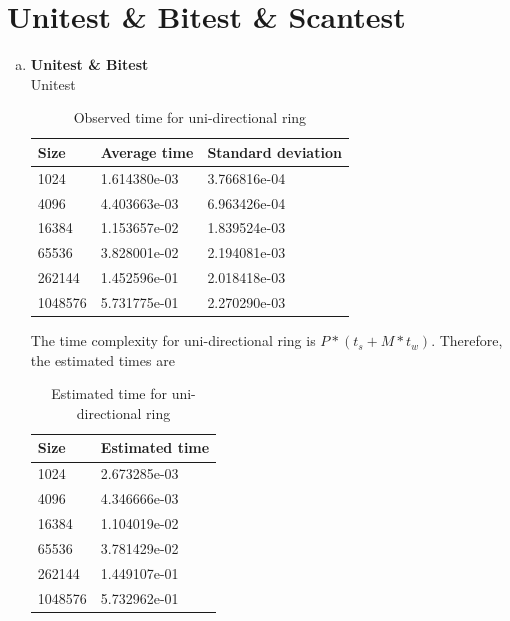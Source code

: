 \documentclass[10pt,letterpaper]{article}
\begin{document}
\section{Unitest \& Bitest \& Scantest}
\begin{enumerate}[(a)]
\item \textbf{Unitest \& Bitest}\\[10pt]
Unitest\\[10pt]
\begin{table}[h]
\centering
\begin{tabular}{lll}\hline
Size    & Average time & Standard deviation \\\hline
1024    & 1.614380e-03 & 3.766816e-04       \\
4096    & 4.403663e-03 & 6.963426e-04       \\
16384   & 1.153657e-02 & 1.839524e-03       \\
65536   & 3.828001e-02 & 2.194081e-03       \\
262144  & 1.452596e-01 & 2.018418e-03       \\
1048576 & 5.731775e-01 & 2.270290e-03      \\\hline
\end{tabular}
\caption{Observed time for uni-directional ring}
\end{table}


The time complexity for uni-directional ring is $P*(t_s+M*t_w)$. Therefore, the estimated times are
\begin{table}[h]
\centering
\begin{tabular}{ll}\hline
Size    & Estimated time \\\hline
1024    & 2.673285e-03   \\
4096    & 4.346666e-03   \\
16384   & 1.104019e-02   \\
65536   & 3.781429e-02   \\
262144  & 1.449107e-01   \\
1048576 & 5.732962e-01  \\\hline
\end{tabular}
\caption{Estimated time for uni-directional ring}
\end{table}



\end{enumerate}
\end{document}
